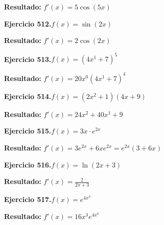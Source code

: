 \documentclass[10pt,a4paper]{article}
\begin{document}
\begin{solbox}
\textbf{Resultado:} \(\displaystyle f'(x) = 5\cos(5x)\)
\end{solbox}

\begin{ejbox}
\textbf{Ejercicio 512.}\quad $f(x) = \sin(2x)$
\end{ejbox}

\begin{solbox}
\textbf{Resultado:} \(\displaystyle f'(x) = 2\cos(2x)\)
\end{solbox}

\begin{ejbox}
\textbf{Ejercicio 513.}\quad $f(x) = (4x^{1} +7)^{5}$
\end{ejbox}

\begin{solbox}
\textbf{Resultado:} \(\displaystyle f'(x) = 20x^{0}(4x^{1} +7)^{4}\)
\end{solbox}

\newpage
\begin{ejbox}
\textbf{Ejercicio 514.}\quad $f(x) = (2x^{2} +1)(4x +9)$
\end{ejbox}

\begin{solbox}
\textbf{Resultado:} \(\displaystyle f'(x) = 24x^{2} +40x^{1} +9\)
\end{solbox}

\begin{ejbox}
\textbf{Ejercicio 515.}\quad $f(x) = 3x \cdot e^{2x}$
\end{ejbox}

\begin{solbox}
\textbf{Resultado:} \(\displaystyle f'(x) = 3e^{2x} + 6xe^{2x} = e^{2x}(3 + 6x)\)
\end{solbox}

\begin{ejbox}
\textbf{Ejercicio 516.}\quad $f(x) = \ln(2x + 3)$
\end{ejbox}

\begin{solbox}
\textbf{Resultado:} \(\displaystyle f'(x) = \frac{2}{2x + 3}\)
\end{solbox}

\newpage
\begin{ejbox}
\textbf{Ejercicio 517.}\quad $f(x) = e^{4x^{4}}$
\end{ejbox}

\begin{solbox}
\textbf{Resultado:} \(\displaystyle f'(x) = 16x^{3}e^{4x^{4}}\)
\end{solbox}
\end{document}
